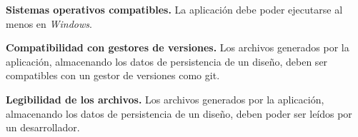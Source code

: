\item \textbf{Sistemas operativos compatibles.}\newline
	La aplicación debe poder ejecutarse al menos en \textit{Windows}.
\item \textbf{Compatibilidad con gestores de versiones.}\newline
	Los archivos generados por la aplicación, almacenando los datos de persistencia de un diseño, deben ser compatibles con un gestor de versiones como git\cite{git}.
\item \textbf{Legibilidad de los archivos.}\newline
	Los archivos generados por la aplicación, almacenando los datos de persistencia de un diseño, deben poder ser leídos por un desarrollador.